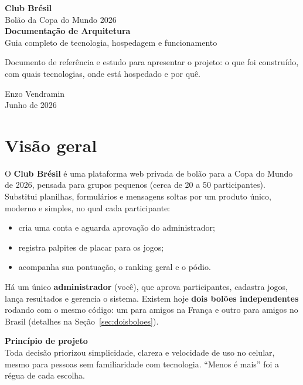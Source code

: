 \documentclass[11pt,a4paper]{article}
\newcommand{\caixa}[2]{%
  \par\medskip\noindent
  \colorbox{verdeclaro}{\begin{minipage}{\dimexpr\linewidth-2\fboxsep}
  \textbf{\color{verde}#1}\\[0.3em]#2
  \end{minipage}}\par\medskip}
\begin{document}
\begin{titlepage}
\centering
\vspace*{3cm}
{\Huge\bfseries\color{verde} Club Brésil}\\[0.3cm]
{\Large Bolão da Copa do Mundo 2026}\\[2cm]
{\huge\bfseries Documentação de Arquitetura}\\[0.5cm]
{\large Guia completo de tecnologia, hospedagem e funcionamento}\\[3cm]
\begin{minipage}{0.8\textwidth}
\centering\color{cinza}
\large Documento de referência e estudo para apresentar o projeto:
o que foi construído, com quais tecnologias, onde está hospedado e por quê.
\end{minipage}
\vfill
{\large Enzo Vendramin}\\[0.2cm]
{\color{cinza} Junho de 2026}
\end{titlepage}

\tableofcontents
\newpage

\section{Visão geral}

O \textbf{Club Brésil} é uma plataforma web privada de bolão para a Copa do
Mundo de 2026, pensada para grupos pequenos (cerca de 20 a 50 participantes).
Substitui planilhas, formulários e mensagens soltas por um produto único,
moderno e simples, no qual cada participante:

\begin{itemize}
  \item cria uma conta e aguarda aprovação do administrador;
  \item registra palpites de placar para os jogos;
  \item acompanha sua pontuação, o ranking geral e o pódio.
\end{itemize}

Há um único \textbf{administrador} (você), que aprova participantes, cadastra
jogos, lança resultados e gerencia o sistema. Existem hoje \textbf{dois bolões
independentes} rodando com o mesmo código: um para amigos na França e outro
para amigos no Brasil (detalhes na Seção~\ref{sec:doisboloes}).

\caixa{Princípio de projeto}{Toda decisão priorizou simplicidade, clareza e
velocidade de uso no celular, mesmo para pessoas sem familiaridade com
tecnologia. ``Menos é mais'' foi a régua de cada escolha.}
\end{document}
